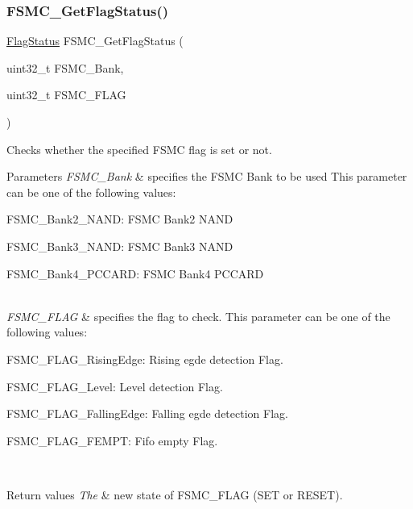 \subsubsection{\texorpdfstring{F\+S\+M\+C\+\_\+\+Get\+Flag\+Status()}{FSMC\_GetFlagStatus()}}
{\footnotesize\ttfamily \hyperlink{group___exported__types_ga89136caac2e14c55151f527ac02daaff}{Flag\+Status} F\+S\+M\+C\+\_\+\+Get\+Flag\+Status (\begin{DoxyParamCaption}\item[{uint32\+\_\+t}]{F\+S\+M\+C\+\_\+\+Bank,  }\item[{uint32\+\_\+t}]{F\+S\+M\+C\+\_\+\+F\+L\+AG }\end{DoxyParamCaption})}



Checks whether the specified F\+S\+MC flag is set or not. 


\begin{DoxyParams}{Parameters}
{\em F\+S\+M\+C\+\_\+\+Bank} & specifies the F\+S\+MC Bank to be used This parameter can be one of the following values\+: \begin{DoxyItemize}
\item F\+S\+M\+C\+\_\+\+Bank2\+\_\+\+N\+A\+ND\+: F\+S\+MC Bank2 N\+A\+ND \item F\+S\+M\+C\+\_\+\+Bank3\+\_\+\+N\+A\+ND\+: F\+S\+MC Bank3 N\+A\+ND \item F\+S\+M\+C\+\_\+\+Bank4\+\_\+\+P\+C\+C\+A\+RD\+: F\+S\+MC Bank4 P\+C\+C\+A\+RD \end{DoxyItemize}
\\
\hline
{\em F\+S\+M\+C\+\_\+\+F\+L\+AG} & specifies the flag to check. This parameter can be one of the following values\+: \begin{DoxyItemize}
\item F\+S\+M\+C\+\_\+\+F\+L\+A\+G\+\_\+\+Rising\+Edge\+: Rising egde detection Flag. \item F\+S\+M\+C\+\_\+\+F\+L\+A\+G\+\_\+\+Level\+: Level detection Flag. \item F\+S\+M\+C\+\_\+\+F\+L\+A\+G\+\_\+\+Falling\+Edge\+: Falling egde detection Flag. \item F\+S\+M\+C\+\_\+\+F\+L\+A\+G\+\_\+\+F\+E\+M\+PT\+: Fifo empty Flag. \end{DoxyItemize}
\\
\hline
\end{DoxyParams}

\begin{DoxyRetVals}{Return values}
{\em The} & new state of F\+S\+M\+C\+\_\+\+F\+L\+AG (S\+ET or R\+E\+S\+ET). \\
\hline
\end{DoxyRetVals}


